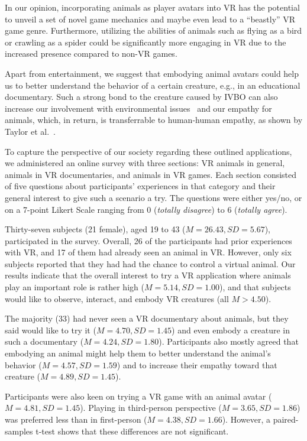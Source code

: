 In our opinion, incorporating animals as player avatars into VR has the potential to unveil a set of novel game mechanics and maybe even lead to a ``beastly'' VR game genre. Furthermore, utilizing the abilities of animals such as flying as a bird or crawling as a spider could be significantly more engaging in VR due to the increased presence compared to non-VR games.

Apart from entertainment, we suggest that embodying animal avatars could help us to better understand the behavior of a certain creature, e.g., in an educational documentary. Such a strong bond to the creature caused by IVBO can also increase our involvement with environmental issues~\cite{ahn2016experiencing,berenguer2007effect} and our empathy for animals, which, in return, is transferrable to human-human empathy, as shown by Taylor et al.~.

To capture the perspective of our society regarding these outlined applications, we administered an online survey with three sections: VR animals in general, animals in VR documentaries, and animals in VR games. Each section consisted of five questions about participants' experiences in that category and their general interest to give such a scenario a try. The questions were either yes/no, or on a 7-point Likert Scale ranging from 0 (\textit{totally disagree}) to 6 (\textit{totally agree}).

Thirty-seven subjects (21 female), aged 19 to 43 ($M = 26.43, SD = 5.67$), participated in the survey. Overall, 26 of the participants had prior experiences with VR, and 17 of them had already seen an animal in VR. However, only six subjects reported that they had had the chance to control a virtual animal. Our results indicate that the overall interest to try a VR application where animals play an important role is rather high ($M = 5.14, SD = 1.00$), and that subjects would like to observe, interact, and embody VR creatures (all $M > 4.50$).

The majority (33) had never seen a VR documentary about animals, but they said would like to try it ($M = 4.70, SD = 1.45$) and even embody a creature in such a documentary ($M = 4.24, SD = 1.80$). Participants also mostly agreed that embodying an animal might help them to better understand the animal's behavior ($M = 4.57, SD = 1.59$) and to increase their empathy toward that creature ($M = 4.89, SD = 1.45$).

Participants were also keen on trying a VR game with an animal avatar ($M = 4.81, SD = 1.45$). Playing in third-person perspective ($M = 3.65, SD = 1.86$) was preferred less than in first-person ($M = 4.38, SD = 1.66$). However, a paired-samples t-test shows that these differences are not significant.

